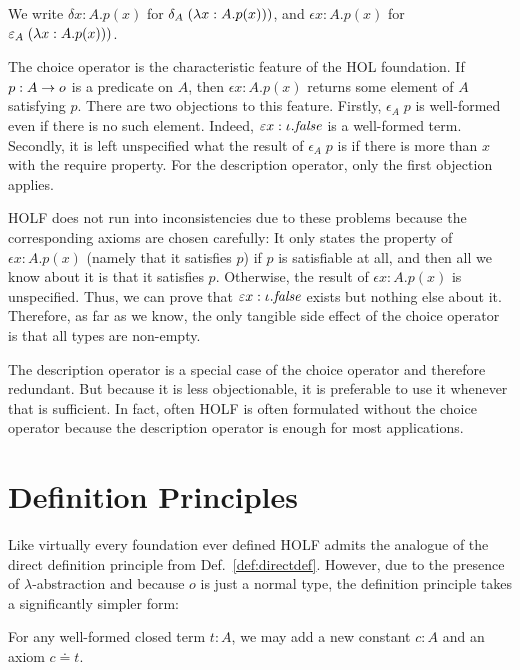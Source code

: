 \begin{notation}
We write $\delta x:A.p(x)$ for $\delta_A\;(\lambda x:A.p(x)))$, and $\epsilon x:A.p(x)$ for $\varepsilon_A\;(\lambda x:A.p(x)))$.
\end{notation}

The choice operator is the characteristic feature of the HOL foundation. If $p:A\rightarrow o$ is a predicate on $A$, then $\epsilon x:A.p(x)$ returns some element of $A$ satisfying $p$. There are two objections to this feature. Firstly, $\epsilon_A\;p$ is well-formed even if there is no such element. Indeed, $\varepsilon x:\iota.\mathit{false}$ is a well-formed term. Secondly, it is left unspecified what the result of $\epsilon_A\;p$ is if there is more than $x$ with the require property. For the description operator, only the first objection applies.

HOLF does not run into inconsistencies due to these problems because the corresponding axioms are chosen carefully: It only states the property of $\epsilon x:A.p(x)$ (namely that it satisfies $p$) if $p$ is satisfiable at all, and then all we know about it is that it satisfies $p$. Otherwise, the result of $\epsilon x:A.p(x)$ is unspecified.
Thus, we can prove that $\varepsilon x:\iota.\mathit{false}$ exists but nothing else about it. Therefore, as far as we know, the only tangible side effect of the choice operator is that all types are non-empty.

The description operator is a special case of the choice operator and therefore redundant. But because it is less objectionable, it is preferable to use it whenever that is sufficient. In fact, often HOLF is often formulated without the choice operator because the description operator is enough for most applications.

\section{Definition Principles}

Like virtually every foundation ever defined HOLF admits the analogue of the direct definition principle from Def.~\ref{def:directdef}. However, due to the presence of $\lambda$-abstraction and because $o$ is just a normal type, the definition principle takes a significantly simpler form:

\begin{definition}
For any well-formed closed term $t:A$, we may add a new constant $c:A$ and an axiom $c\doteq t$.
\end{definition}

